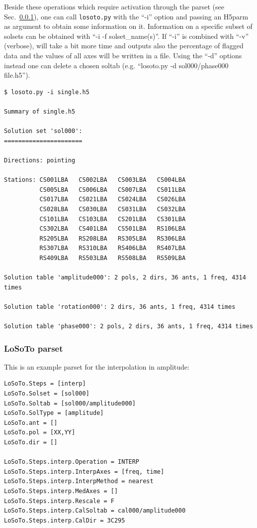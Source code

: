 \documentclass[]{article}
\begin{document}
Beside these operations which require activation through the \losoto{} parset (see Sec.~\ref{losoto:parset}), one can call \texttt{losoto.py} with the ``-i'' option and passing an H5parm as argument to obtain some information on it. Information on a specific subset of solsets can be obtained with ``-i -f solset\_name(s)''. If ``-i'' is combined with ``-v'' (verbose), \losoto{} will take a bit more time and outputs also the percentage of flagged data and the values of all axes will be written in a file. Using the ``-d'' options instead one can delete a chosen soltab (e.g. ``losoto.py -d sol000/phase000 file.h5'').

\begin{verbatim}
$ losoto.py -i single.h5

Summary of single.h5

Solution set 'sol000':
======================

Directions: pointing

Stations: CS001LBA   CS002LBA   CS003LBA   CS004LBA
          CS005LBA   CS006LBA   CS007LBA   CS011LBA
          CS017LBA   CS021LBA   CS024LBA   CS026LBA
          CS028LBA   CS030LBA   CS031LBA   CS032LBA
          CS101LBA   CS103LBA   CS201LBA   CS301LBA
          CS302LBA   CS401LBA   CS501LBA   RS106LBA
          RS205LBA   RS208LBA   RS305LBA   RS306LBA
          RS307LBA   RS310LBA   RS406LBA   RS407LBA
          RS409LBA   RS503LBA   RS508LBA   RS509LBA

Solution table 'amplitude000': 2 pols, 2 dirs, 36 ants, 1 freq, 4314 times

Solution table 'rotation000': 2 dirs, 36 ants, 1 freq, 4314 times

Solution table 'phase000': 2 pols, 2 dirs, 36 ants, 1 freq, 4314 times
\end{verbatim}

\subsubsection{LoSoTo parset}
\label{losoto:parset}

This is an example parset for the interpolation in amplitude:
\begin{verbatim}
LoSoTo.Steps = [interp]
LoSoTo.Solset = [sol000]
LoSoTo.Soltab = [sol000/amplitude000]
LoSoTo.SolType = [amplitude]
LoSoTo.ant = []
LoSoTo.pol = [XX,YY]
LoSoTo.dir = []

LoSoTo.Steps.interp.Operation = INTERP
LoSoTo.Steps.interp.InterpAxes = [freq, time]
LoSoTo.Steps.interp.InterpMethod = nearest
LoSoTo.Steps.interp.MedAxes = []
LoSoTo.Steps.interp.Rescale = F
LoSoTo.Steps.interp.CalSoltab = cal000/amplitude000
LoSoTo.Steps.interp.CalDir = 3C295
\end{verbatim}
\end{document}
